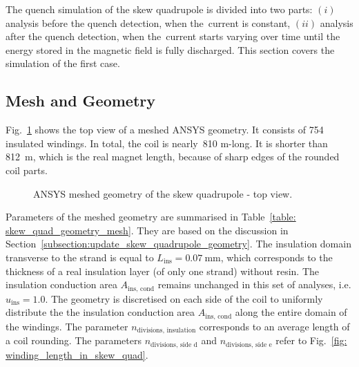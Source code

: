 
The quench simulation of the skew quadrupole is divided into two parts: $(i)$ analysis before the quench detection, when the~current is constant, $(ii)$ analysis after the quench detection, when the~current starts varying over time until the energy stored in the magnetic field is fully discharged. This section covers the simulation of the first case. 

\subsection{Mesh and Geometry}

Fig.~\ref{fig:skew_quad_ansys_top_view} shows the top view of a meshed ANSYS geometry. It consists of 754 insulated windings. In total, the coil is nearly~810 m-long. It is shorter than 812~m, which is the real magnet length, because of sharp edges of the rounded coil parts. 

\begin{figure}[H]
    \centering
    \caption{ANSYS meshed geometry of the skew quadrupole - top view.}
    \label{fig:skew_quad_ansys_top_view}
\end{figure}

Parameters of the meshed geometry are summarised in Table~\ref{table: skew_quad_geometry_mesh}. They are based on the discussion in Section~\ref{subsection:update_skew_quadrupole_geometry}. The insulation domain transverse to the strand is equal to $L_\text{ins}=0.07~\text{mm}$, which corresponds to the thickness of a real insulation layer (of only one strand) without resin. The insulation conduction area $A_\text{ins, cond}$ remains unchanged in this set of analyses, i.e. $u_\text{ins}=1.0$. The geometry is discretised on each side of the coil to uniformly distribute the the insulation conduction area $A_\text{ins, cond}$ along the entire domain of the windings. The parameter $n_\text{divisions, insulation}$ corresponds to an average length of a coil rounding. The parameters $n_\text{divisions, side d}$ and $n_\text{divisions, side e}$ refer to Fig.~\ref{fig: winding_length_in_skew_quad}.

